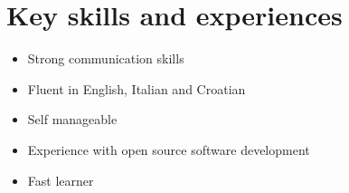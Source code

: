\section*{Key skills and experiences}
\begin{itemize}
  \item Strong communication skills
  \item Fluent in English, Italian and Croatian
  \item Self manageable
  \item Experience with open source software development
  \item Fast learner
\end{itemize}
